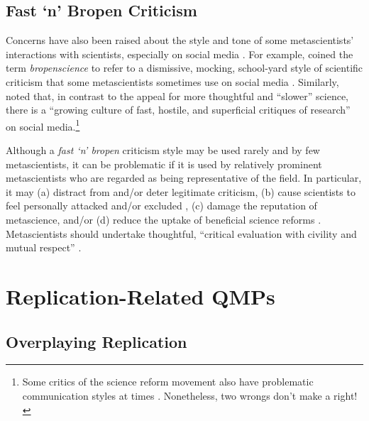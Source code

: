 \documentclass[authordate, meta, issue]{jote-new-article}
\begin{document}
\subsection{Fast ‘n’ Bropen Criticism}



Concerns have also been raised about the style and tone of some metascientists’ interactions with scientists, especially on social media \parencites[e.g.,][]{Fiske2016}[p. 692]{Hamlin2017}{Pownall2022a}{Whitaker2020}. For example, \textcite{Whitaker2020} coined the term \emph{bropenscience} to refer to a dismissive, mocking, school-yard style of scientific criticism that some metascientists sometimes use on social media \parencites[e.g.,][]{Anonymous2021}[see also][]{Derksen2022}[pp. 529-530]{Pownall2021}. Similarly, \textcite{Pownall2022} noted that, in contrast to the appeal for more thoughtful and “slower” science, there is a “growing culture of fast, hostile, and superficial critiques of research” on social media.\footnote{Some critics of the science reform movement also have problematic communication styles at times \parencites[for some examples, see][]{Holcombe2021}. Nonetheless, two wrongs don’t make a right!}



Although a \emph{fast ‘n’ bropen} criticism style may be used rarely and by few metascientists, it can be problematic if it is used by relatively prominent metascientists who are regarded as being representative of the field. In particular, it may (a) distract from and/or deter legitimate criticism, (b) cause scientists to feel personally attacked and/or excluded \parencites[e.g.,][]{Derksen2022}[p. 692]{Hamlin2017}{Pownall2021}, (c) damage the reputation of metascience, and/or (d) reduce the uptake of beneficial science reforms \parencite{Gervais2021}. Metascientists should undertake thoughtful, “critical evaluation with civility and mutual respect” \parencite{bib118}.



\section{Replication-Related QMPs}



\subsection{Overplaying Replication}
\end{document}

